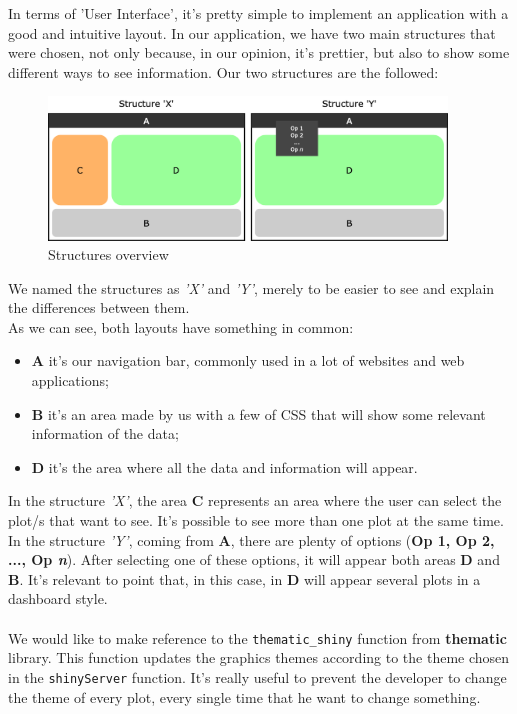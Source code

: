 In terms of 'User Interface', it's pretty simple to implement an application with a good and intuitive layout. In our application, we have two main structures that were chosen, not only because, in our opinion, it's prettier, but also to show some different ways to see information. Our two structures are the followed: \\

\begin{figure}[h!]
\centering
\includegraphics[width=300pt,trim=10 0 0 -10mm]{images/coiso.png}
\caption{Structures overview}
\label{fig:overview}
\end{figure}

We named the structures as \textit{'X'} and \textit{'Y'}, merely to be easier to see and explain the differences between them.\\
As we can see, both layouts have something in common: \\
\begin{itemize}
    \item \textbf{A} it's our navigation bar, commonly used in a lot of websites and web applications;
    \item \textbf{B} it's an area made by us with a few of CSS that will show some relevant information of the data;
    \item \textbf{D} it's the area where all the data and information will appear.  
\end{itemize}

In the structure \textit{'X'}, the area \textbf{C} represents an area where the user can select the plot/s that want to see. It's possible to see more than one plot at the same time. \\ 
In the structure \textit{'Y'}, coming from \textbf{A}, there are plenty of options (\textbf{Op 1, Op 2, ..., Op \textit{n}}). After selecting one of these options, it will appear both areas \textbf{D} and \textbf{B}. It's relevant to point that, in this case, in \textbf{D}  will appear several plots in a dashboard style.\\
\\
We would like to make reference to the \texttt{thematic\_shiny} function from \textbf{thematic} library. This function updates the graphics themes according to the theme chosen in the \texttt{shinyServer} function. It's really useful to prevent the developer to change the theme of every plot, every single time that he want to change something.